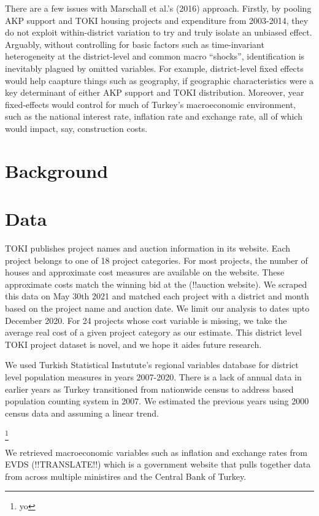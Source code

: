 \documentclass[10pt, oneside]{article}   	%
\numberwithin{equation}{section}
\begin{document}
There are a few issues with Marschall et al.'s (2016) approach. Firstly, by pooling AKP support and TOKI housing projects and expenditure from 2003-2014, they do not exploit within-district variation to try and truly isolate an unbiased effect. Arguably, without controlling for basic factors such as time-invariant heterogeneity at the district-level and common macro ``shocks'', identification is inevitably plagued by omitted variables. For example, district-level fixed effects would help caapture things such as geography, if geographic characteristics were a key determinant of either AKP support and TOKI distribution. Moreover, year fixed-effects would control for much of Turkey's macroeconomic environment, such as the national interest rate, inflation rate and exchange rate, all of which would impact, say, construction costs. 

\section{Background}



\section{Data}

TOKI publishes project names and auction information in its website. Each project belongs to one of 18 project categories. For most projects, the number of houses and approximate cost measures are available on the website. These approximate costs match the winning bid at the (!!auction website). We scraped this data on May 30th 2021 and matched each project with a district and month based on the project name and auction date. We limit our analysis to dates upto December 2020. For 24 projects whose cost variable is missing, we take the average real cost of a given project category as our estimate. This district level TOKI project dataset is novel, and we hope it aides future research.

We used Turkish Statistical Instutute's regional variables database for district level population measures in years 2007-2020. There is a lack of annual data in earlier years as Turkey transitioned from nationwide census to address based population counting system in 2007. We estimated the previous years using 2000 census data and assuming a linear trend. 

\footnote{yo}

We retrieved macroeconomic variables such as inflation and exchange rates from EVDS (!!TRANSLATE!!) which is a government website that pulls together data from across multiple ministires and the Central Bank of Turkey.
\end{document}
